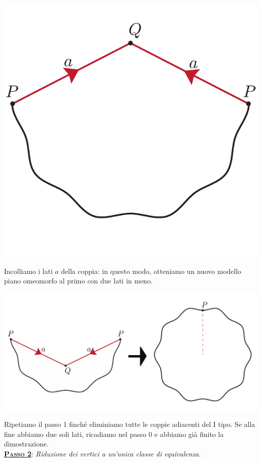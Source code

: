 \begin{demonstration}
\begin{center}
	\includegraphics[trim=0cm 0cm 0cm 0cm, clip, scale=0.35]{images/cutandpastealgorithmstep1-1.pdf}
\end{center}
Incolliamo i lati $a$ della coppia: in questo modo, otteniamo un nuovo modello piano omeomorfo al primo con due lati in meno.
\begin{center}
	\includegraphics[trim=0cm 0cm 0cm 0cm, clip, scale=0.35]{images/cutandpastealgorithmstep1-2.pdf}
\end{center}
Ripetiamo il passo 1 finché eliminiamo tutte le coppie adiacenti del I tipo. Se alla fine abbiamo due soli lati, ricadiamo nel passo 0 e abbiamo già finito la dimostrazione.\\
\textsc{\underline{\textbf{Passo 2}}}: \textit{Riduzione dei vertici a un'unica classe di equivalenza}.\\

\end{demonstration}
